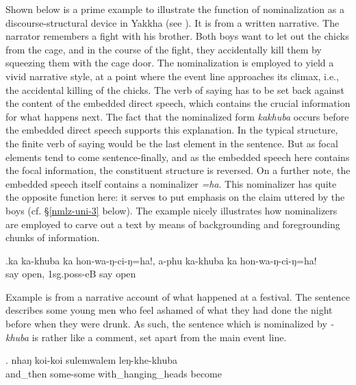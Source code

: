 Shown below is a prime example to illustrate the function of  nominalization as a discourse-structural device in Yakkha (see \Next). It  is from a written narrative. The narrator remembers a fight with his brother. Both boys want to let out the chicks from the cage, and in the course of the fight, they accidentally kill them by squeezing them with the cage door.  The nominalization is employed to yield a vivid narrative style, at a point where the event line approaches its climax, i.e., the accidental killing of the chicks. The verb of saying has to be set back against the content of the embedded direct speech, which contains the crucial information for what happens next. The fact that the nominalized form \emph{kakhuba}  occurs before the embedded direct speech supports this explanation. In the typical structure, the finite verb of saying would be the last element in the sentence. But as focal elements tend to come sentence-finally, and as the embedded speech here contains the focal information, the constituent structure is reversed.  On a further note, the embedded speech itself contains a nominalizer  \emph{=ha}. This nominalizer has quite the opposite function here: it serves to put emphasis on the claim uttered by the boys (cf. §\ref{nmlz-uni-3} below).  The example nicely illustrates how nominalizers are employed to carve out a text by means of backgrounding and foregrounding chunks of information.
	
	
	\exg.ka  ka-khuba ka  hon-wa-ŋ-ci-ŋ=ha!, a-phu ka-khuba ka   hon-wa-ŋ-ci-ŋ=ha!\\
	  say  open, {\sc 1sg.poss-}eB  say  open\\
	 
	
	
Example \Next is from a narrative account of what happened at a festival. The sentence describes some young men who feel ashamed of what they had done the night before when they were drunk. As such, the sentence which is nominalized by  \emph{-khuba} is rather like a comment, set apart from the main event line. 

	\exg. nhaŋ  koi-koi sulemwalem leŋ-khe-khuba\\
	and\_then some-some with\_hanging\_heads become\\
	 


